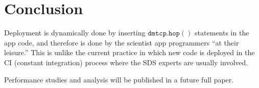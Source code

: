 \documentclass[conference]{IEEEtran}
\begin{document}
\section{Conclusion}
\label{sec:conclusion}

Deployment is dynamically done by inserting $\mathtt{dmtcp.hop()}$ statements in the app code, and therefore is done by the scientist app programmers ``at their leisure.'' This is unlike the current practice in which new code is deployed in the CI (constant integration) process where the SDS experts are usually involved.

Performance studies and analysis will be published in a future full paper.



\end{document}
